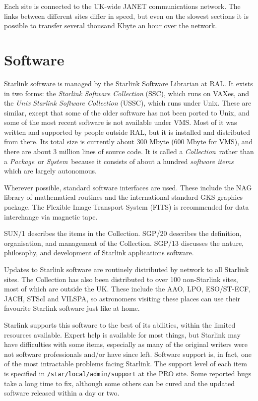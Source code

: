 Each site is connected to the UK-wide JANET communications network.
The links between different sites differ in speed, but even on the slowest
sections it is possible to transfer several thousand Kbyte an hour over the
network.

\section{Software}

Starlink software is managed by the Starlink Software Librarian at RAL.
It exists in two forms: the {\em Starlink Software Collection} (SSC), which
runs on VAXes, and the {\em Unix Starlink Software Collection} (USSC), which
runs under Unix.
These are similar, except that some of the older software has not been ported
to Unix, and some of the most recent software is not available under VMS.
Most of it was written and supported by people outside RAL, but it is installed
and distributed from there.
Its total size is currently about 300 Mbyte (600 Mbyte for VMS), and there are
about 3 million lines of source code.
It is called a {\em Collection}\, rather than a {\em Package}\, or
{\em System}\, because it consists of about a hundred {\em software items}\,
which are largely autonomous.

Wherever possible, standard software interfaces are used.
These include the NAG library of mathematical routines and the international
standard GKS graphics package.
The Flexible Image Transport System (FITS) is recommended for data interchange
via magnetic tape.

SUN/1 describes the items in the Collection.
SGP/20 describes the definition, organisation, and management of the Collection.
SGP/13 discusses the nature, philosophy, and development of Starlink
applications software.

Updates to Starlink software are routinely distributed by network to all
Starlink sites.
The Collection has also been distributed to over 100 non-Starlink sites, most of
which are outside the UK.
These include the AAO, LPO, ESO/ST-ECF, JACH, STScI and VILSPA, so astronomers
visiting these places can use their favourite Starlink software just like at
home.

Starlink supports this software to the best of its abilities, within the
limited resources available.
Expert help is available for most things, but Starlink may have difficulties
with some items, especially as many of the original writers were not software
professionals and/or have since left.
Software support is, in fact, one of the most intractable problems facing
Starlink.
The support level of each item is specified in {\tt /star/\-local/\-admin/\-support}
at the PRO site.
Some reported bugs take a long time to fix, although some others can be cured
and the updated software released within a day or two.

